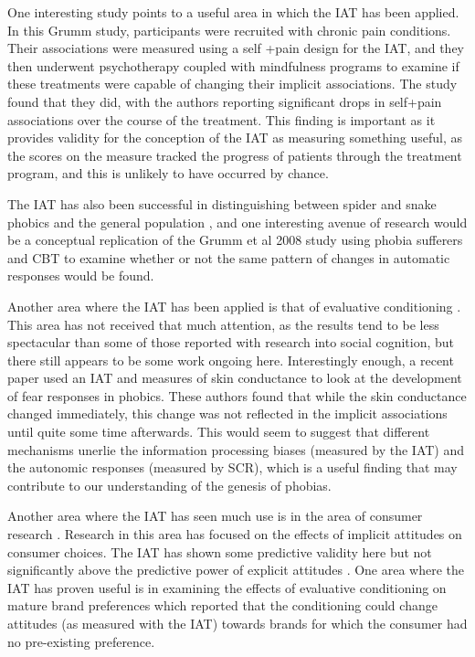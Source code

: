 One interesting study \cite{Grumm2008} points to a useful area in which the IAT has been applied. In this Grumm study, participants were recruited with chronic pain conditions. Their associations were measured using a self +pain design for the IAT, and they then underwent psychotherapy coupled with mindfulness programs to examine if these treatments were capable of changing their implicit associations. The study found that they did, with the authors reporting significant drops in self+pain associations over the course of the treatment. This finding is important as it provides validity for the conception of the IAT as measuring something useful, as the scores on the measure tracked the progress of patients through the treatment program, and this is unlikely to have occurred by chance.  

 The IAT has also been successful in distinguishing between spider and snake phobics and the general population \cite{Egloff2002,Lane2007}  , and one interesting avenue of research would be a conceptual replication of the Grumm et al 2008 study using phobia sufferers and CBT to examine whether or not the same pattern of changes in automatic responses would be found. 

Another area where the IAT has been applied is that of evaluative conditioning \cite{Mitchell2003}. This area has not received that much attention, as the results tend to be less spectacular than some of those reported with research into social cognition, but there still appears to be some work ongoing here. Interestingly enough, a recent paper \cite{Boschen2007} used an IAT and measures of skin conductance to look at the development of fear responses in phobics. These authors found that while the skin conductance changed immediately, this change was not reflected in the implicit associations until quite some time afterwards. This would seem to suggest that different mechanisms unerlie the information processing biases (measured by the IAT) and the autonomic responses (measured by SCR), which is a useful finding that may contribute to our understanding of the genesis of phobias. 

Another area where the IAT has seen much use is in the area of consumer research \cite{Lane2007,Maison2001}. Research in this area has focused on the effects of implicit attitudes on consumer choices. The IAT has shown some predictive validity here \cite{Maison2004}  but not significantly above the predictive power of explicit attitudes \cite{Greenwald2009}. One area where the IAT has proven useful is in examining the effects of evaluative conditioning on mature brand preferences \cite{Gibson2008} which reported that the conditioning could change attitudes (as measured with the IAT) towards brands for which the consumer had no pre-existing preference.

